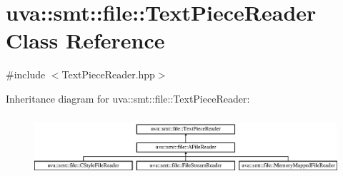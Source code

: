 \hypertarget{classuva_1_1smt_1_1file_1_1_text_piece_reader}{}\section{uva\+:\+:smt\+:\+:file\+:\+:Text\+Piece\+Reader Class Reference}
\label{classuva_1_1smt_1_1file_1_1_text_piece_reader}


{\ttfamily \#include $<$Text\+Piece\+Reader.\+hpp$>$}

Inheritance diagram for uva\+:\+:smt\+:\+:file\+:\+:Text\+Piece\+Reader\+:\begin{figure}[H]
\begin{center}
\leavevmode
\includegraphics[height=2.258065cm]{classuva_1_1smt_1_1file_1_1_text_piece_reader}
\end{center}
\end{figure}
